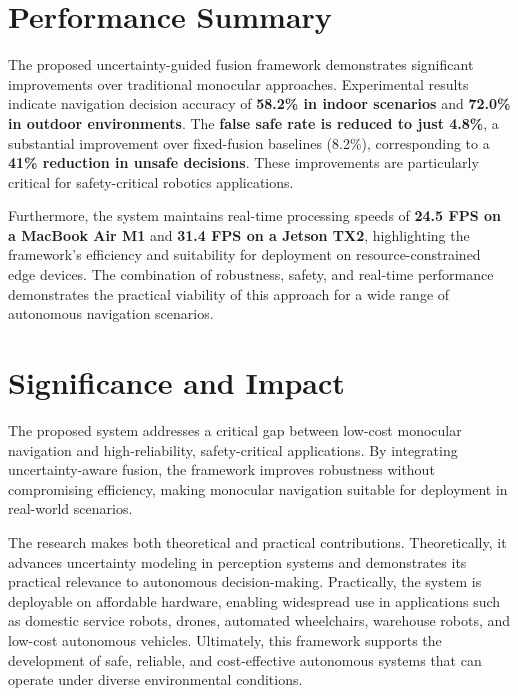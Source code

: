 \documentclass[12pt,oneside]{book}
\begin{document}
\begin{samepage}

\section{Performance Summary}
The proposed uncertainty-guided fusion framework demonstrates significant improvements over traditional monocular approaches. Experimental results indicate navigation decision accuracy of \textbf{58.2\% in indoor scenarios} and \textbf{72.0\% in outdoor environments}. The \textbf{false safe rate is reduced to just 4.8\%}, a substantial improvement over fixed-fusion baselines (8.2\%), corresponding to a \textbf{41\% reduction in unsafe decisions}. These improvements are particularly critical for safety-critical robotics applications.

Furthermore, the system maintains real-time processing speeds of \textbf{24.5 FPS on a MacBook Air M1} and \textbf{31.4 FPS on a Jetson TX2}, highlighting the framework’s efficiency and suitability for deployment on resource-constrained edge devices. The combination of robustness, safety, and real-time performance demonstrates the practical viability of this approach for a wide range of autonomous navigation scenarios.

\section{Significance and Impact}
The proposed system addresses a critical gap between low-cost monocular navigation and high-reliability, safety-critical applications. By integrating uncertainty-aware fusion, the framework improves robustness without compromising efficiency, making monocular navigation suitable for deployment in real-world scenarios.

The research makes both theoretical and practical contributions. Theoretically, it advances uncertainty modeling in perception systems and demonstrates its practical relevance to autonomous decision-making. Practically, the system is deployable on affordable hardware, enabling widespread use in applications such as domestic service robots, drones, automated wheelchairs, warehouse robots, and low-cost autonomous vehicles. Ultimately, this framework supports the development of safe, reliable, and cost-effective autonomous systems that can operate under diverse environmental conditions.


\end{samepage}
\end{document}
